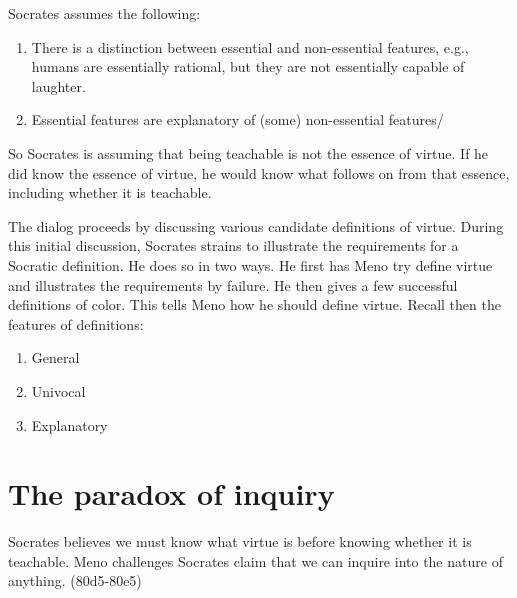 \documentclass[10 pt]{article}
\begin{document}
Socrates assumes the following:
\begin{enumerate}
\item There is a distinction between essential and non-essential features, e.g., humans are essentially rational, but they are not essentially capable of laughter.
\item Essential features are explanatory of (some) non-essential features/
\end{enumerate}
So Socrates is assuming that being teachable is not the essence of virtue. If he did know the essence of virtue, he would know what follows on from that essence, including whether it is teachable. 

The dialog proceeds by discussing  various candidate definitions of virtue. During this initial discussion, Socrates strains to illustrate the requirements for a Socratic definition. He does so in two ways. He first has Meno try define virtue and illustrates the requirements by failure. He then gives a few successful definitions of color. This tells Meno how he should define virtue. Recall then the features of definitions: 
\begin{enumerate}
\item General
\item Univocal
\item Explanatory 
\end{enumerate}

\section*{The paradox of inquiry}
Socrates believes we must know what virtue is before knowing whether it is teachable. Meno challenges Socrates claim that we can inquire into the nature of anything. (80d5-80e5)
\end{document}
